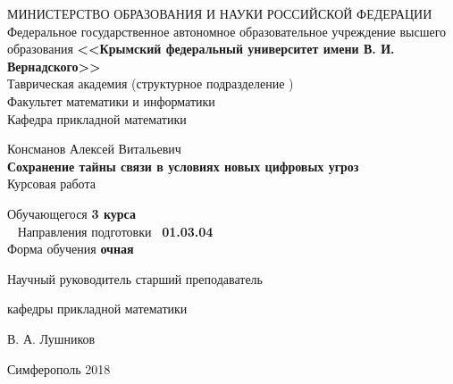     \begin{titlepage}
    \newpage
	\pagestyle{empty} %
    \begin{center}
    \normalsize МИНИСТЕРСТВО ОБРАЗОВАНИЯ И НАУКИ РОССИЙСКОЙ ФЕДЕРАЦИИ\\ 
    \small  {Федеральное государственное автономное образовательное учреждение высшего образования} 
    \large \textbf{<<Крымский  федеральный  университет имени В. И. Вернадского>>} \\  \vspace{2mm}
    Таврическая академия (структурное подразделение ) \\
    \vspace{2mm}
    Факультет математики и информатики \\
    \vspace{2mm}
    Кафедра прикладной математики 
    \end{center}
    \vspace{3em}

    \begin{center}
	\normalsize Консманов Алексей Витальевич \\
    \LARGE \textbf{Сохранение тайны связи в условиях новых цифровых угроз} \\
    \vspace{1em}
    \normalsize Курсовая работа 
    \end{center}

    \vspace{1em}
    
    \begin{center}
    	\begin{tabbing}	%
    		\hspace{3cm}Обучающегося \hspace{3cm} \textbf{3 курса}\\ %
    		\hspace{2.7cm}Направления подготовки \hspace*{5mm}  \textbf{01.03.04}\\
    		\hspace{3cm}Форма обучения \hspace{26mm} \textbf{очная}
    	\end{tabbing}
    
	\vspace {3em}
    \flushleft Научный руководитель \hspace{20mm}  старший преподаватель 
    
    \hspace{75mm}кафедры прикладной математики  
    
    
    \hspace{75mm}В. А. Лушников
	\end{center}
    \vspace{\fill}

    \begin{center}
    Симферополь 2018
    \end{center}

    \end{titlepage}
